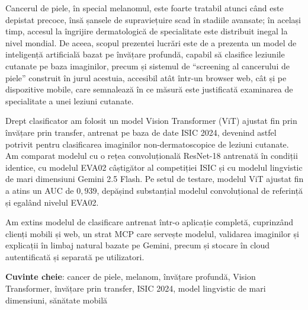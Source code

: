 Cancerul de piele, în special melanomul, este foarte tratabil atunci când este
depistat precoce, însă șansele de supraviețuire scad în stadiile avansate; în
același timp, accesul la îngrijire dermatologică de specialitate este distribuit
inegal la nivel mondial. De aceea, scopul prezentei lucrări este de a prezenta un
model de inteligență artificială bazat pe învățare profundă, capabil să clasifice
leziunile cutanate pe baza imaginilor, precum și sistemul de ``screening al
cancerului de piele'' construit în jurul acestuia, accesibil atât într-un browser
web, cât și pe dispozitive mobile, care semnalează în ce măsură este justificată
examinarea de specialitate a unei leziuni cutanate.

Drept clasificator am folosit un model Vision Transformer (ViT) ajustat fin prin
învățare prin transfer, antrenat pe baza de date ISIC 2024, devenind astfel
potrivit pentru clasificarea imaginilor non-dermatoscopice de leziuni cutanate.
Am comparat modelul cu o rețea convoluțională ResNet-18 antrenată în condiții
identice, cu modelul EVA02 câștigător al competiției ISIC și cu modelul lingvistic
de mari dimensiuni Gemini 2.5 Flash. Pe setul de testare, modelul ViT ajustat fin
a atins un AUC de $0{,}939$, depășind substanțial modelul convoluțional de
referință și egalând nivelul EVA02.

Am extins modelul de clasificare antrenat într-o aplicație completă, cuprinzând
clienți mobili și web, un strat MCP care servește modelul, validarea imaginilor și
explicații în limbaj natural bazate pe Gemini, precum și stocare în cloud
autentificată și separată pe utilizatori.

\textbf{Cuvinte cheie}: cancer de piele, melanom, învățare profundă, Vision
Transformer, învățare prin transfer, ISIC 2024, model lingvistic de mari
dimensiuni, sănătate mobilă
